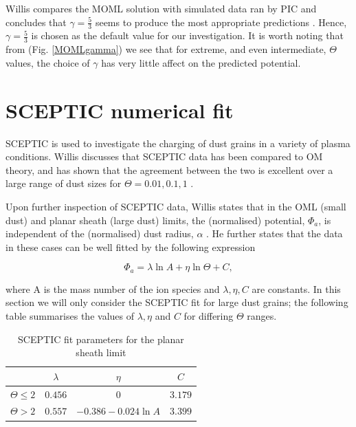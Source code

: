 \documentclass{article}
\begin{document}
Willis compares the MOML solution with simulated data ran by PIC and concludes that 
$\gamma = \frac{5}{3}$ seems to produce the most appropriate predictions \cite{Willis}. 
Hence, $\gamma = \frac{5}{3}$ is chosen as the default value for our investigation. It is worth noting
that from (Fig. \ref{MOMLgamma}) we see that for extreme, and even intermediate, $\Theta$ values, 
the choice of $\gamma$ has very little affect on the predicted potential.

    
\newpage 

\section{SCEPTIC numerical fit}

\smallskip

SCEPTIC is used to investigate the charging of dust grains in a variety
of plasma conditions. Willis discusses that SCEPTIC data has been compared
to OM theory, and has shown that the agreement between the two is excellent over a large range of dust sizes 
for $\Theta = 0.01,0.1,1$ \cite{ScepticFit}.

\medskip

Upon further inspection of SCEPTIC data, Willis states that in the OML (small dust)
and planar sheath (large dust) limits, the (normalised) potential, $\Phi_a$, is independent of the (normalised)
dust radius, $\alpha$ \cite{ScepticFit}. He further states that the data in these cases can
be well fitted by the following expression

\begin{equation}\label{eq:SCEPTICfit}
\Phi_a = \lambda \ln{A} + \eta \ln{\Theta} + C,
\end{equation}

\smallskip

\noindent where A is the mass number of the ion species and $\lambda, \eta, C$ are 
constants. In this section we will only consider the SCEPTIC
fit for large dust grains; the following table summarises the values of $\lambda, \eta$ and $C$
for differing $\Theta$ ranges.

\begin{table}[h!]
\begin{center}
    \caption{SCEPTIC fit parameters for the planar sheath limit}
    \label{tab:ValueTable}
    \begin{tabular}{c|c|c|c} 
    \hline
    & $\lambda$ & $\eta$ & $C$ \\
    \hline
    $\Theta \leq 2$ & $0.456$ & $0$ & $3.179$\\
    $\Theta > 2$ & $0.557$ & $-0.386 - 0.024\ln{A}$ & $3.399$\\
    \end{tabular}
\end{center}
\end{table}
\end{document}
